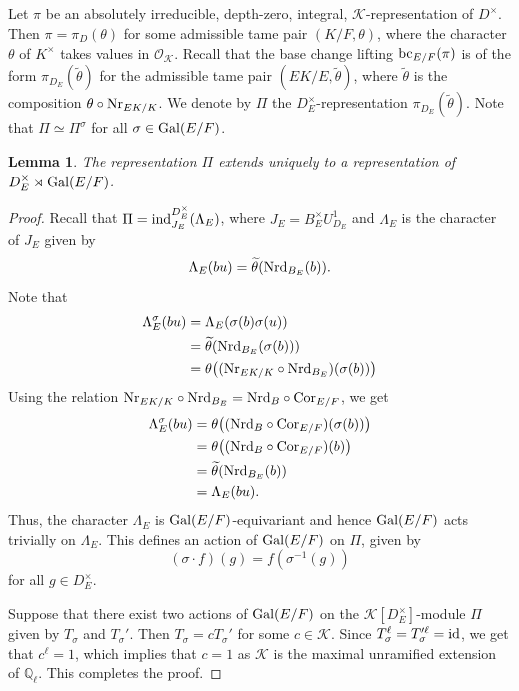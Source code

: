 \documentclass[10pt, reqno]{amsart}
\theoremstyle{plain}
\numberwithin{equation}{section}
\newtheorem{lemma}[theorem]{Lemma}
\begin{document}
\subsection{}
Let $\pi$ be an absolutely irreducible, depth-zero, integral, $\mathcal{K}$-representation of $D^\times$. Then $\pi = \pi_D(\theta)$ for some admissible tame pair $(K/F,\theta)$, where the character $\theta$ of $K^\times$ takes values in $\mathcal{O}_{\mathcal{K}}$. Recall that the base change lifting ${\rm bc}_{E/F}(\pi)$ is of the form $\pi_{D_E}(\widetilde{\theta})$ for the admissible tame pair $(EK/E,\widetilde{\theta})$, where $\widetilde{\theta}$ is the composition $\theta\circ {\rm Nr}_{EK/K}$. We denote by $\Pi$ the $D_E^\times$-representation $\pi_{D_E}(\widetilde{\theta})$. Note that $\Pi\simeq \Pi^\sigma$ for all $\sigma\in {\rm Gal}(E/F)$.
\begin{lemma}
The representation $\Pi$ extends uniquely to a representation of $D_E^\times\rtimes {\rm Gal}(E/F)$.
\end{lemma}
\begin{proof}
Recall that $\Pi = {\rm ind}_{J_E}^{D_E^\times}(\Lambda_E)$, where $J_E = B_E^\times U_{D_E}^1$ and $\Lambda_E$ is the character of $J_E$ given by 
$$ \Lambda_E(bu) = \widetilde{\theta}({\rm Nrd}_{B_E}(b)). $$
Note that \begin{align*}
\Lambda_E^\sigma(bu) 
&= \Lambda_E(\sigma(b)\sigma(u))\\
&=\widetilde{\theta}({\rm Nrd}_{B_E}(\sigma(b)))\\
&=\theta\big(({\rm Nr}_{EK/K}\circ {\rm Nrd}_{B_E})(\sigma(b))\big)
\end{align*}
Using the relation ${\rm Nr}_{EK/K}\circ{\rm Nrd}_{B_E} = {\rm Nrd}_B\circ {\rm Cor}_{E/F}$, we get
\begin{align*}
\Lambda_E^\sigma(bu)
&=\theta\big(({\rm Nrd}_B\circ {\rm Cor}_{E/F})(\sigma(b))\big)\\
&=\theta\big(({\rm Nrd}_B\circ {\rm Cor}_{E/F})(b)\big)\\
&=\widetilde{\theta}({\rm Nrd}_{B_E}(b))\\
&=\Lambda_E(bu).
\end{align*}
Thus, the character $\Lambda_E$ is ${\rm Gal}(E/F)$-equivariant and hence ${\rm Gal}(E/F)$ acts trivially on $\Lambda_E$. This defines an action of ${\rm Gal}(E/F)$ on $\Pi$, given by
$$ (\sigma\cdot f)(g) = f(\sigma^{-1}(g)) $$
for all $g\in D_E^\times$. 

Suppose that there exist two actions of ${\rm Gal}(E/F)$ on the $\mathcal{K}[D_E^\times]$-module $\Pi$ given by $T_\sigma$ and $T_\sigma'$. Then 
$T_\sigma = cT_\sigma'$ for some $c\in \mathcal{K}$. Since $T_\sigma^\ell = T_\sigma'^\ell = {\rm id}$, we get that $c^\ell =1$, which implies that $c=1$ as $\mathcal{K}$ is the maximal unramified extension of $\mathbb{Q}_\ell$. This completes the proof. 
\end{proof}
\end{document}
